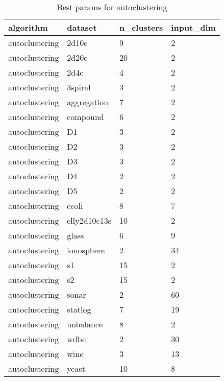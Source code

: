 \begin{table}[H]
\centering
\caption{Best params for autoclustering}
\label{tab:params:autoclustering}
\begin{tabular}{|l|l|l|l|}
\hline
algorithm & dataset & n\_clusters & input\_dim \\
\hline
autoclustering & 2d10c & 9 & 2 \\
\hline
autoclustering & 2d20c & 20 & 2 \\
\hline
autoclustering & 2d4c & 4 & 2 \\
\hline
autoclustering & 3spiral & 3 & 2 \\
\hline
autoclustering & aggregation & 7 & 2 \\
\hline
autoclustering & compound & 6 & 2 \\
\hline
autoclustering & D1 & 3 & 2 \\
\hline
autoclustering & D2 & 3 & 2 \\
\hline
autoclustering & D3 & 3 & 2 \\
\hline
autoclustering & D4 & 2 & 2 \\
\hline
autoclustering & D5 & 2 & 2 \\
\hline
autoclustering & ecoli & 8 & 7 \\
\hline
autoclustering & elly2d10c13s & 10 & 2 \\
\hline
autoclustering & glass & 6 & 9 \\
\hline
autoclustering & ionosphere & 2 & 34 \\
\hline
autoclustering & s1 & 15 & 2 \\
\hline
autoclustering & s2 & 15 & 2 \\
\hline
autoclustering & sonar & 2 & 60 \\
\hline
autoclustering & statlog & 7 & 19 \\
\hline
autoclustering & unbalance & 8 & 2 \\
\hline
autoclustering & wdbc & 2 & 30 \\
\hline
autoclustering & wine & 3 & 13 \\
\hline
autoclustering & yeast & 10 & 8 \\
\hline
\end{tabular}
\end{table}